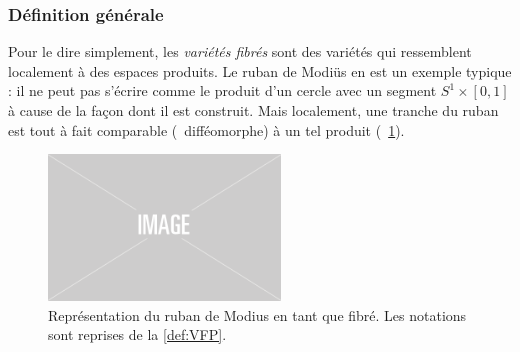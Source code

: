 \subsubsection{Définition générale}\label{subsec:def2VFP}

Pour le dire simplement, les \emph{variétés fibrés} sont des variétés qui ressemblent localement à des espaces produits. 
Le ruban de Modiüs en est un exemple typique : il ne peut pas s'écrire comme le produit d'un cercle avec un segment $S^{1}\times [0,1]$ à cause de la façon dont il est construit. Mais localement, une tranche du ruban est tout à fait comparable (\ie~difféomorphe) à un tel produit (\cf~\cref{fig:ruban2modius}).
\begin{figure}[h]
	\includegraphics[width=0.55\textwidth]{fig/placeholder}
	\caption[Ruban de Mobius comme variété fibrée]{\DONE Représentation du ruban de Modius en tant que fibré. Les notations sont reprises de la \cref{def:VFP}.}
	\label{fig:ruban2modius}
\end{figure}
\skipl

